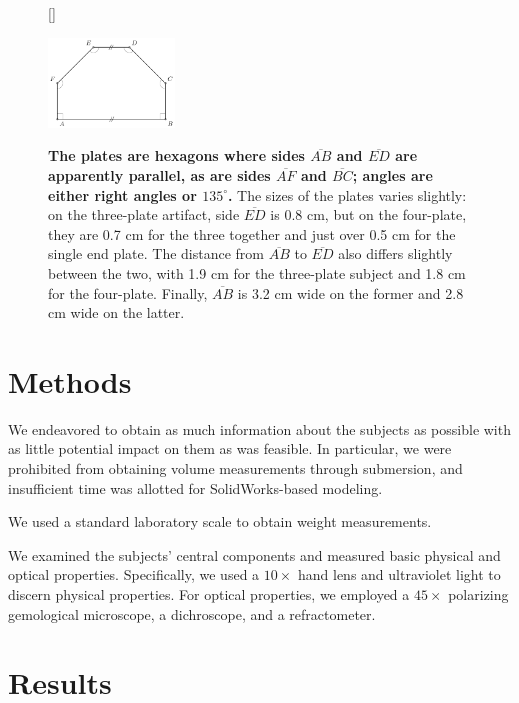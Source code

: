 \documentclass[10pt,twoside,openany]{article}
\theoremstyle{definition}
\begin{document}
\begin{figure}
[\FBwidth]
{\caption{\label{fig:plate}\textbf{The plates are hexagons where sides $\overline{AB}$ and $\overline{ED}$ are apparently parallel, as are sides $\overline{AF}$ and $\overline{BC}$; angles are either right angles or $135^\circ$.} The sizes of the plates varies slightly: on the three-plate artifact, side $\overline{ED}$ is 0.8 cm, but on the four-plate, they are 0.7 cm for the three together and just over 0.5 cm for the single end plate. The distance from $\overline{AB}$ to $\overline{ED}$ also differs slightly between the two, with 1.9 cm for the three-plate subject and 1.8 cm for the four-plate. Finally, $\overline{AB}$ is 3.2 cm wide on the former and 2.8 cm wide on the latter.}}
{\includegraphics[width=0.3\textwidth]{plate.pdf}}
\end{figure}

\section{Methods}
We endeavored to obtain as much information about the subjects as possible with as little potential impact on them as was feasible.
In particular, we were prohibited from obtaining volume measurements through submersion, and insufficient time was allotted for SolidWorks-based modeling.

We used a standard laboratory scale to obtain weight measurements.

We examined the subjects' central components and measured basic physical and optical properties.
Specifically, we used a $10\times$ hand lens and ultraviolet light to discern physical properties.
For optical properties, we employed a $45\times$ polarizing gemological microscope, a dichroscope, and a refractometer.

\section{Results}
\end{document}

